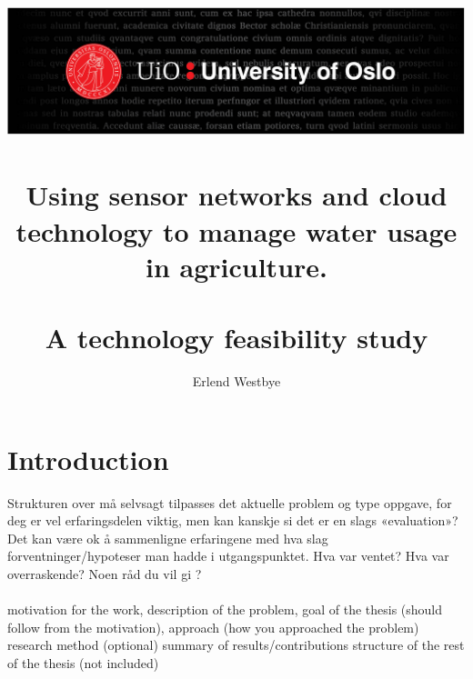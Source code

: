 \documentclass[]{uiophd}
\begin{document}
\title{\includegraphics[scale=0.5]{toppfelt-english.jpg}\\\\
Using sensor networks and cloud technology to manage water usage in agriculture.
\\\\
\large A technology feasibility study}
\author{Erlend Westbye}


\frontmatter
\maketitle
\tableofcontents
\linespread{1.3}



\mainmatter

\chapter{Introduction}
Strukturen over må selvsagt tilpasses det aktuelle problem og type oppgave, for deg er vel erfaringsdelen viktig, men kan kanskje si det er en slags «evaluation»?
Det kan være ok å sammenligne erfaringene med hva slag forventninger/hypoteser man hadde i utgangspunktet.
Hva var ventet? Hva var overraskende? Noen råd du vil gi ?
\\\\
motivation for the work, description of the problem, 
goal of the thesis (should follow from the motivation), 
approach (how you approached the problem)
research method (optional)
summary of results/contributions
structure of the rest of the thesis (not included)
\end{document}
